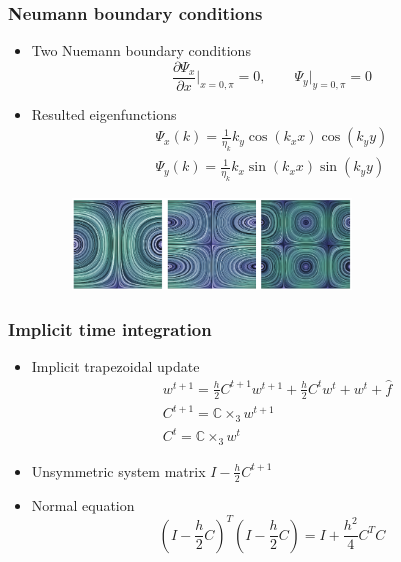 \documentclass[serif,mathserif, 12pt]{beamer}
\begin{document}
\begin{frame}
  \frametitle{Neumann boundary conditions}
  \begin{itemize}
  \item Two Nuemann boundary conditions
    \[
    \frac{\partial \Psi_x}{\partial x}\big|_{x=0,\pi} = 0, \quad\quad \Psi_y\big |_{y=0, \pi} = 0
    \]
  \item Resulted eigenfunctions
    \[
    \boxed{
    \begin{split}
      \Psi_x(k) = \frac{1}{\eta_k}k_y\cos(k_x x)\cos(k_y y) \\
      \Psi_y(k) = \frac{1}{\eta_k}k_x\sin(k_x x)\sin(k_y y)
    \end{split}
    }
    \]
     {
    \begin{figure}
      \centering
      \includegraphics[width=0.7\textwidth]{img/neu_boundary}
    \end{figure}
    }
  \end{itemize}
\end{frame}

\begin{frame}
  \frametitle{Implicit time integration}
  \begin{itemize}
  \item Implicit trapezoidal update
    \[
    \begin{split}
      &w^{t+1} = \frac{h}{2}C^{t+1}w^{t+1} +\frac{h}{2}C^t w^t + w^t+\hat f \\
      &C^{t+1} = \mathbb{C}\times_3 w^{t+1} \\
      &C^{t} = \mathbb{C}\times_3 w^{t}
    \end{split}    
    \]
  \item<2-> Unsymmetric system matrix $I-\frac{h}{2}C^{t+1}$
    \pause
  \item<3-> Normal equation
    \[
    (I-\frac{h}{2}C)^T(I-\frac{h}{2}C) = I+\frac{h^2}{4}C^TC
    \]
  \end{itemize}
\end{frame}
\end{document}
